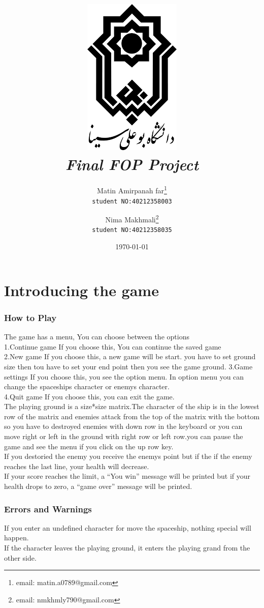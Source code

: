 \documentclass[12pt,a4paper]{article}
\title{\includegraphics[scale=0.5]{Graphics/BASU_Logo_header.png}\\[20pt] {\Huge \emph{Final FOP Project}}}
\author{Matin Amirpanah far\thanks{email: matin.a0789@gmail.com}\\
	\texttt{student NO:40212358003}\and
	Nima Makhmali\thanks{email: nmkhmly790@gmail.com}\\ \texttt{student NO:40212358035}}
\date{\today}
\begin{document}
	
	\maketitle
	
	\newpage
	\tableofcontents
	
	\newpage
	\setcounter{section}{0}
	\part{Introducing the game}\label{introducing}

	\section{How to Play}\label{introducing.how}
	The game has a menu, You can choose between the options\\
	1.Continue game
If you choose this, You can continue the saved game\\
	2.New game
If you choose this, a new game will be start. you have to set ground size then tou have to set your end point
then you see the game ground.
	3.Game settings
If you choose this, you see the option menu. In option menu you can change the spaceships character or enemys character.\\
	4.Quit game
If you choose this, you can exit the game.\\

The playing ground is a size*size matrix.The character of the ship is in the lowest row of the matrix and enemies attack from the top of the matrix with the bottom so you have to destroyed enemies with down row in the keyboard or you can move right or left in the ground with right row or left row.you can pause the game and see the menu if you click on the up row key.\\

If you destoried the enemy you receive the enemys point but if the if the enemy reaches the last line, your health will decrease.\\

If your score reaches the limit, a ``You win'' message will be printed but if  your health drops to zero, a ``game over'' message will be printed.
 
	\section{Errors and Warnings}\label{introducing.errors}
	If you enter an undefined character for move the spaceship, nothing special will happen.\\
	If the character leaves the playing ground, it enters the playing grand from the other side.\\
	
\end{document}
